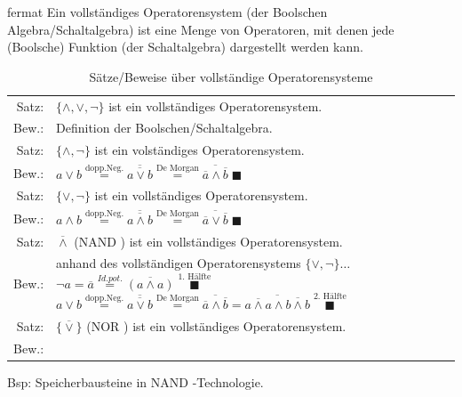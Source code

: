 \documentclass[10pt,a4paper]{scrartcl}
\begin{document}
\begin{Theorem}{}{fermat}
	Ein vollständiges Operatorensystem (der Boolschen Algebra/Schaltalgebra) ist eine Menge von Operatoren, mit denen jede (Boolsche) Funktion (der Schaltalgebra) dargestellt werden kann.
\end{Theorem}

\begin{table}
	\centering
	\begin{tabular}{rp{10cm}}
	Satz: & $ \{\wedge, \vee, \neg\} $ ist ein vollständiges Operatorensystem.\\
	Bew.:& Definition der Boolschen/Schaltalgebra.\\ \hline
	Satz: & $ \{\wedge, \neg\} $ ist ein volständiges Operatorensystem.\\
	Bew.:& $ a \vee b \overset{\text{dopp.Neg.}}{=} \overline{\overline{a\vee b}} \overset{\text{De Morgan}}{=} \overline{\overline{a} \wedge \overline{b}}\; \blacksquare$\\ \hline
	Satz: & $ \{\vee, \neg\} $ ist ein vollständiges Operatorensystem.\\
	Bew.:& $ a \wedge b \overset{\text{dopp.Neg.}}{=} \overline{\overline{a \wedge b}} \overset{\text{De Morgan}}{=} \overline{\overline{a} \vee \overline{b}}\; \blacksquare $\\ \hline
	Satz: & $ \overline{\wedge} $ (\glqq NAND \grqq) ist ein vollständiges Operatorensystem.\\
	Bew.: & anhand des vollständigen Operatorensystems $ \{\vee, \neg\}\ldots $
	\newline $ \neg a = \overline{a} \overset{Id.pot.}{=} \overline{(a \wedge a)} \;\overset{\text{1. Hälfte}}{\blacksquare}$
	\newline $ a \vee b \overset{\text{dopp.Neg.}}{=} \overline{\overline{a \vee b}} \overset{\text{De Morgan}}{=} \overline{\overline{a} \wedge \overline{b}} = \overline{\overline{a \wedge a} \wedge \overline{b \wedge b}} \;\overset{\text{2. Hälfte}}{\blacksquare}$\\ \hline
	Satz: & $ \{\overline{\vee}\} $ (\glqq NOR \grqq) ist ein vollständiges Operatorensystem.\\
	Bew.: & $  $\\ %
\end{tabular}
\caption{Sätze/Beweise über vollständige Operatorensysteme}
\end{table}

Bsp: Speicherbausteine in \glqq NAND \grqq-Technologie.\\
\end{document}
